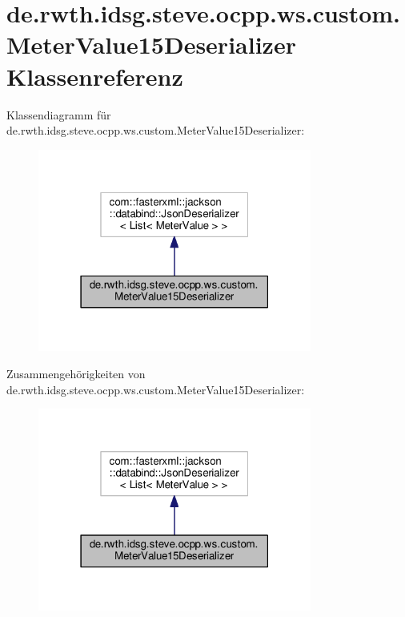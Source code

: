 \hypertarget{classde_1_1rwth_1_1idsg_1_1steve_1_1ocpp_1_1ws_1_1custom_1_1_meter_value15_deserializer}{\section{de.\+rwth.\+idsg.\+steve.\+ocpp.\+ws.\+custom.\+Meter\+Value15\+Deserializer Klassenreferenz}
\label{classde_1_1rwth_1_1idsg_1_1steve_1_1ocpp_1_1ws_1_1custom_1_1_meter_value15_deserializer}
}


Klassendiagramm für de.\+rwth.\+idsg.\+steve.\+ocpp.\+ws.\+custom.\+Meter\+Value15\+Deserializer\+:\nopagebreak
\begin{figure}[H]
\begin{center}
\leavevmode
\includegraphics[width=255pt]{classde_1_1rwth_1_1idsg_1_1steve_1_1ocpp_1_1ws_1_1custom_1_1_meter_value15_deserializer__inherit__graph}
\end{center}
\end{figure}


Zusammengehörigkeiten von de.\+rwth.\+idsg.\+steve.\+ocpp.\+ws.\+custom.\+Meter\+Value15\+Deserializer\+:\nopagebreak
\begin{figure}[H]
\begin{center}
\leavevmode
\includegraphics[width=255pt]{classde_1_1rwth_1_1idsg_1_1steve_1_1ocpp_1_1ws_1_1custom_1_1_meter_value15_deserializer__coll__graph}
\end{center}
\end{figure}
